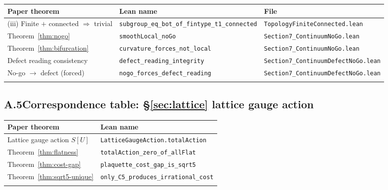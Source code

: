 \documentclass[sn-mathphys-num,Numbered]{sn-jnl}
\theoremstyle{thmstyleone}
\theoremstyle{thmstylethree}
\theoremstyle{thmstyletwo}
\begin{document}
\begin{appendices}
\vspace{6pt}
\noindent{}
\label{tab:lean-nogo}
\begin{tabular}{@{}p{5.5cm}p{4.5cm}p{3.5cm}@{}}
\toprule
Paper theorem & Lean name & File \\
\midrule
(iii) Finite $+$ connected $\Rightarrow$ trivial &
  \texttt{subgroup\_\allowbreak eq\_\allowbreak bot\_\allowbreak of\_\allowbreak fintype\_\allowbreak t1\_\allowbreak connected} &
  \texttt{TopologyFinite\allowbreak Connected.lean} \\
Theorem~\ref{thm:nogo} &
  \texttt{smoothLocal\_\allowbreak noGo} &
  \texttt{Section7\_ContinuumNoGo.lean} \\
Theorem~\ref{thm:bifurcation} &
  \texttt{curvature\_\allowbreak forces\_\allowbreak not\_\allowbreak local} &
  \texttt{Section7\_ContinuumNoGo.lean} \\
Defect reading consistency &
  \texttt{defect\_\allowbreak reading\_\allowbreak integrity} &
  \texttt{Section7\_Continuum\allowbreak DefectNoGo.lean} \\
No-go $\to$ defect (forced) &
  \texttt{nogo\_\allowbreak forces\_\allowbreak defect\_\allowbreak reading} &
  \texttt{Section7\_Continuum\allowbreak DefectNoGo.lean} \\
\botrule
\end{tabular}
\vspace{4pt}


\subsection*{A.5\quad Correspondence table: \S\ref{sec:lattice} lattice gauge action}


\vspace{6pt}
\noindent{}
\label{tab:lean-lattice}
\begin{tabular}{@{}p{5.5cm}p{6cm}@{}}
\toprule
Paper theorem & Lean name \\
\midrule
Lattice gauge action $S[U]$ &
  \texttt{LatticeGaugeAction.totalAction} \\
Theorem~\ref{thm:flatness} &
  \texttt{totalAction\_zero\_of\_allFlat} \\
Theorem~\ref{thm:cost-gap} &
  \texttt{plaquette\_cost\_gap\_is\_sqrt5} \\
Theorem~\ref{thm:sqrt5-unique} &
  \texttt{only\_C5\_produces\_irrational\_cost} \\
\botrule
\end{tabular}
\vspace{4pt}



\end{appendices}
\end{document}
